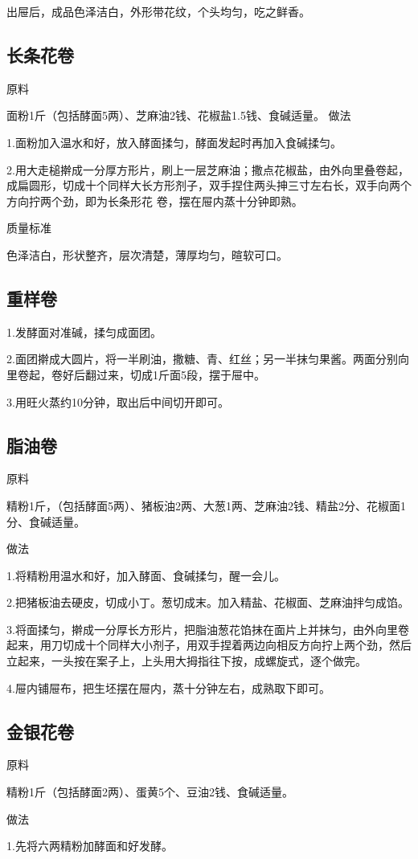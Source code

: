 \documentclass{ctexbook}
\begin{document}
出屉后，成品色泽洁白，外形带花纹，个头均匀，吃之鲜香。
\subsection{长条花卷}
原料

面粉1斤（包括酵面5两）、芝麻油2钱、花椒盐1.5钱、食碱适量。
做法

1.面粉加入温水和好，放入酵面揉匀，酵面发起时再加入食碱揉匀。

2.用大走槌擀成一分厚方形片，刷上一层芝麻油；撒点花椒盐，由外向里叠卷起，成扁圆形，切成十个同样大长方形剂子，双手捏住两头抻三寸左右长，双手向两个方向拧两个劲，即为长条形花 卷，摆在屉内蒸十分钟即熟。

质量标准

色泽洁白，形状整齐，层次清楚，薄厚均匀，暄软可口。
\subsection{重样卷}
1.发酵面对准碱，揉匀成面团。

2.面团擀成大圆片，将一半刷油，撒糖、青、红丝；另一半抹匀果酱。两面分别向里卷起，卷好后翻过来，切成1斤面5段，摆于屉中。

3.用旺火蒸约10分钟，取出后中间切开即可。
\subsection{脂油卷}
原料

精粉1斤，（包括酵面5两）、猪板油2两、大葱1两、芝麻油2钱、精盐2分、花椒面1分、食碱适量。

做法

1.将精粉用温水和好，加入酵面、食碱揉匀，醒一会儿。

2.把猪板油去硬皮，切成小丁。葱切成末。加入精盐、花椒面、芝麻油拌匀成馅。

3.将面揉匀，擀成一分厚长方形片，把脂油葱花馅抹在面片上并抹匀，由外向里卷起来，用刀切成十个同样大小剂子，用双手捏着两边向相反方向拧上两个劲，然后立起来，一头按在案子上，上头用大拇指往下按，成螺旋式，逐个做完。

4.屉内铺屉布，把生坯摆在屉内，蒸十分钟左右，成熟取下即可。
\subsection{金银花卷}
原料

精粉1斤（包括酵面2两）、蛋黄5个、豆油2钱、食碱适量。

做法

1.先将六两精粉加酵面和好发酵。
\end{document}
